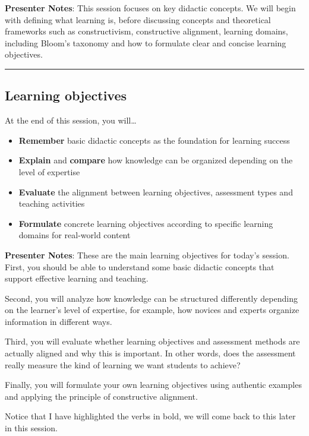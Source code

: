 \documentclass[
  letterpaper,
  DIV=11,
  numbers=noendperiod]{scrartcl}
\providecommand{\tightlist}{%
  \setlength{\itemsep}{0pt}\setlength{\parskip}{0pt}}
\begin{document}
\textbf{Presenter Notes}: This session focuses on key didactic concepts.
We will begin with defining what learning is, before discussing concepts
and theoretical frameworks such as constructivism, constructive
alignment, learning domains, including Bloom's taxonomy and how to
formulate clear and concise learning objectives.

\begin{center}\rule{0.5\linewidth}{0.5pt}\end{center}

\subsection{Learning objectives}\label{learning-objectives}

At the end of this session, you will\ldots{}

\begin{itemize}
\tightlist
\item
  \textbf{Remember} basic didactic concepts as the foundation for
  learning success
\item
  \textbf{Explain} and \textbf{compare} how knowledge can be organized
  depending on the level of expertise
\item
  \textbf{Evaluate} the alignment between learning objectives,
  assessment types and teaching activities
\item
  \textbf{Formulate} concrete learning objectives according to specific
  learning domains for real-world content
\end{itemize}

\textbf{Presenter Notes}: These are the main learning objectives for
today's session. First, you should be able to understand some basic
didactic concepts that support effective learning and teaching.

Second, you will analyze how knowledge can be structured differently
depending on the learner's level of expertise, for example, how novices
and experts organize information in different ways.

Third, you will evaluate whether learning objectives and assessment
methods are actually aligned and why this is important. In other words,
does the assessment really measure the kind of learning we want students
to achieve?

Finally, you will formulate your own learning objectives using authentic
examples and applying the principle of constructive alignment.

Notice that I have highlighted the verbs in bold, we will come back to
this later in this session.
\end{document}
